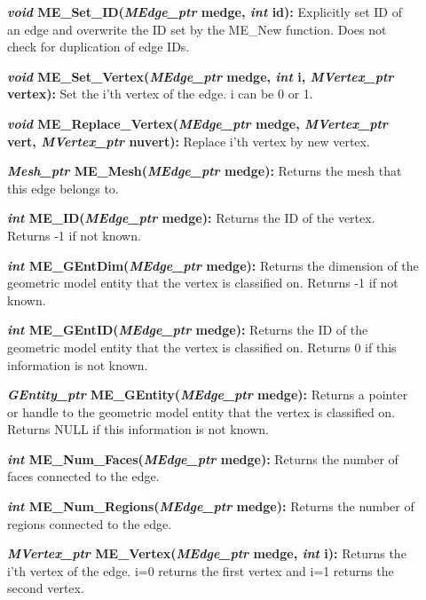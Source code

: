 \documentclass[12pt]{article}
\begin{document}
\begin{description}
\item[]{\bf {\em void} ME\_Set\_ID({\em MEdge\_ptr} medge,
    {\em int} id):} Explicitly set ID of an edge and overwrite the
  ID set by the ME\_New function. Does not check for duplication of
  edge IDs.
  
\item[]{\bf {\em void} ME\_Set\_Vertex({\em MEdge\_ptr}
    medge, {\em int} i, {\em MVertex\_ptr} vertex):} Set the
  i'th vertex of the edge. i can be 0 or 1.
  
\item[]{\bf {\em void} ME\_Replace\_Vertex({\em MEdge\_ptr}
    medge, {\em MVertex\_ptr} vert, {\em MVertex\_ptr} nuvert):}
  Replace i'th vertex by new vertex.

\item[]
  
\item[]{\bf {\em Mesh\_ptr} ME\_Mesh({\em MEdge\_ptr}
    medge):} Returns the mesh that this edge belongs to.
  
\item[]{\bf {\em int} ME\_ID({\em MEdge\_ptr} medge):}
  Returns the ID of the vertex. Returns -1 if not known.
  
\item[]{\bf {\em int} ME\_GEntDim({\em MEdge\_ptr} medge):}
  Returns the dimension of the geometric model entity that the vertex
  is classified on. Returns -1 if not known.
  
\item[]{\bf {\em int} ME\_GEntID({\em MEdge\_ptr} medge):}
  Returns the ID of the geometric model entity that the vertex is
  classified on.  Returns 0 if this information is not known.
  
\item[]{\bf {\em GEntity\_ptr} ME\_GEntity({\em MEdge\_ptr}
    medge):} Returns a pointer or handle to the geometric model entity
  that the vertex is classified on. Returns NULL if this information
  is not known.

\item[]
  
\item[]{\bf {\em int} ME\_Num\_Faces({\em MEdge\_ptr}
    medge):} Returns the number of faces connected to the edge.
  
\item[]{\bf {\em int} ME\_Num\_Regions({\em MEdge\_ptr}
    medge):} Returns the number of regions connected to the edge.
  
\item[]{\bf {\em MVertex\_ptr} ME\_Vertex({\em MEdge\_ptr}
    medge, {\em int} i):} Returns the i'th vertex of the edge. i=0
  returns the first vertex and i=1 returns the second vertex.
  

\end{description}
\end{document}
